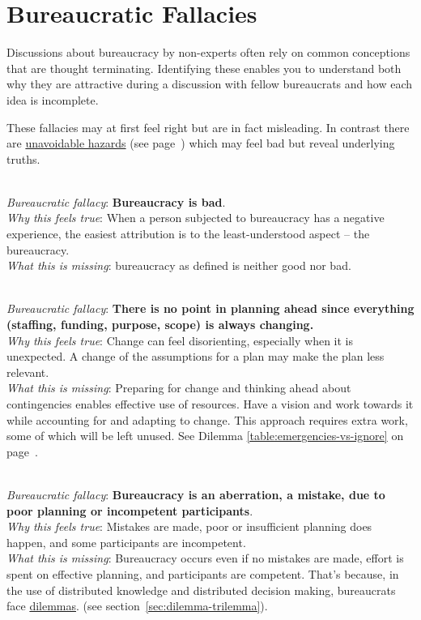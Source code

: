 \section{Bureaucratic Fallacies\label{sec:fallacies}}

Discussions about bureaucracy by non-experts often rely on common conceptions that are \gls{thought terminating}. Identifying these enables you to understand both why they are attractive during a discussion with fellow bureaucrats and how each idea is incomplete.

These fallacies may at first feel right but are in fact misleading. In contrast there are  \hyperref[sec:unavoidable-hazards]{unavoidable hazards} (see 
page~\pageref{sec:unavoidable-hazards})
which may feel bad but reveal underlying truths.

\ \\
\textit{Bureaucratic fallacy}: \textbf{Bureaucracy is bad}. \\
\textit{Why this feels true}: When a person subjected to bureaucracy has a negative experience, the easiest attribution is to the least-understood aspect -- the bureaucracy.\\
\textit{What this is missing}: \Gls{bureaucracy} as defined is neither good nor bad. 

\ \\
\textit{Bureaucratic fallacy}: 
\textbf{There is no point in planning ahead since everything (staffing, funding, purpose, scope) is always changing.}\\
\textit{Why this feels true}: Change can feel disorienting, especially when it is unexpected. A change of the assumptions for a plan may make the plan less relevant. \\
\textit{What this is missing}: Preparing for change and thinking ahead about contingencies enables effective use of resources. Have a vision and work towards it while accounting for and adapting to change. This approach requires extra work, some of which will be left unused. See Dilemma \ref{table:emergencies-vs-ignore} on 
page~\pageref{table:emergencies-vs-ignore}.


\ \\
\textit{Bureaucratic fallacy}: \textbf{Bureaucracy is an aberration, a mistake, due to poor planning or incompetent participants}. \\
\textit{Why this feels true}: Mistakes are made, poor or insufficient planning does happen, and some participants are incompetent.\\
\textit{What this is missing}: Bureaucracy occurs even if no mistakes are made, effort is spent on effective planning, and participants are competent. That's because, in the use of distributed knowledge and distributed decision making, bureaucrats face \hyperref[sec:dilemma-trilemma]{dilemmas}.
\ifsectionref
(see section~\ref{sec:dilemma-trilemma}).
\fi

